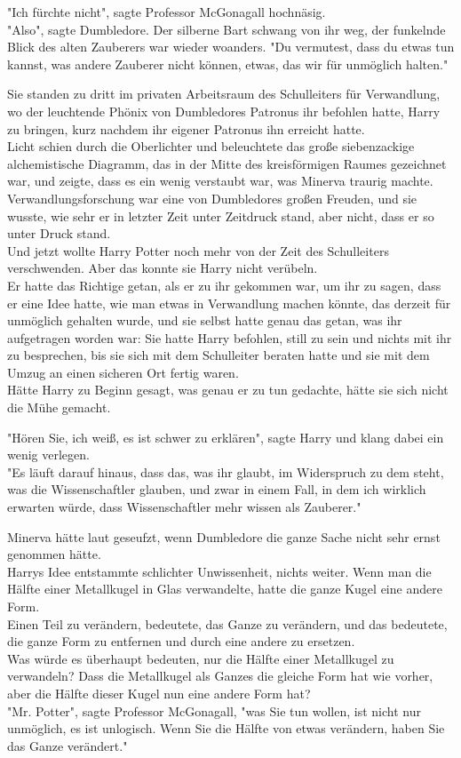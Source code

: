 {"Ich fürchte nicht", sagte Professor McGonagall hochnäsig.\\ "Also", sagte Dumbledore. Der silberne Bart schwang von ihr weg, der funkelnde Blick des alten Zauberers war wieder woanders. "Du vermutest, dass du etwas tun kannst, was andere Zauberer nicht können, etwas, das wir für unmöglich halten."

Sie standen zu dritt im privaten Arbeitsraum des Schulleiters für Verwandlung, wo der leuchtende Phönix von Dumbledores Patronus ihr befohlen hatte, Harry zu bringen, kurz nachdem ihr eigener Patronus ihn erreicht hatte.\\ Licht schien durch die Oberlichter und beleuchtete das große siebenzackige alchemistische Diagramm, das in der Mitte des kreisförmigen Raumes gezeichnet war, und zeigte, dass es ein wenig verstaubt war, was Minerva traurig machte.\\ Verwandlungsforschung war eine von Dumbledores großen Freuden, und sie wusste, wie sehr er in letzter Zeit unter Zeitdruck stand, aber nicht, dass er so unter Druck stand.\\ Und jetzt wollte Harry Potter noch mehr von der Zeit des Schulleiters verschwenden. Aber das konnte sie Harry nicht verübeln.\\ Er hatte das Richtige getan, als er zu ihr gekommen war, um ihr zu sagen, dass er eine Idee hatte, wie man etwas in Verwandlung machen könnte, das derzeit für unmöglich gehalten wurde, und sie selbst hatte genau das getan, was ihr aufgetragen worden war: Sie hatte Harry befohlen, still zu sein und nichts mit ihr zu besprechen, bis sie sich mit dem Schulleiter beraten hatte und sie mit dem Umzug an einen sicheren Ort fertig waren.\\ Hätte Harry zu Beginn gesagt, was genau er zu tun gedachte, hätte sie sich nicht die Mühe gemacht.

"Hören Sie, ich weiß, es ist schwer zu erklären", sagte Harry und klang dabei ein wenig verlegen.\\ "Es läuft darauf hinaus, dass das, was ihr glaubt, im Widerspruch zu dem steht, was die Wissenschaftler glauben, und zwar in einem Fall, in dem ich wirklich erwarten würde, dass Wissenschaftler mehr wissen als Zauberer."

Minerva hätte laut geseufzt, wenn Dumbledore die ganze Sache nicht sehr ernst genommen hätte.\\ Harrys Idee entstammte schlichter Unwissenheit, nichts weiter. Wenn man die Hälfte einer Metallkugel in Glas verwandelte, hatte die ganze Kugel eine andere Form.\\ Einen Teil zu verändern, bedeutete, das Ganze zu verändern, und das bedeutete, die ganze Form zu entfernen und durch eine andere zu ersetzen.\\ Was würde es überhaupt bedeuten, nur die Hälfte einer Metallkugel zu verwandeln? Dass die Metallkugel als Ganzes die gleiche Form hat wie vorher, aber die Hälfte dieser Kugel nun eine andere Form hat?\\ "Mr. Potter", sagte Professor McGonagall, "was Sie tun wollen, ist nicht nur unmöglich, es ist unlogisch. Wenn Sie die Hälfte von etwas verändern, haben Sie das Ganze verändert."

}
